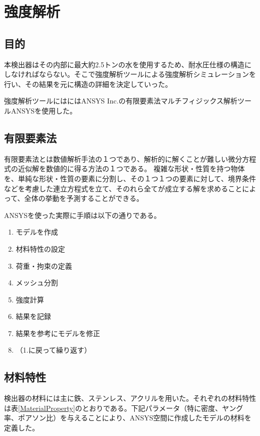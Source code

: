 \documentclass[11pt]{jreport}
\newcommand{\tabref}[1]{表\ref{#1}}
\begin{document}
\newpage
\section{強度解析}
\subsection{目的}
本検出器はその内部に最大約2.5トンの水を使用するため、耐水圧仕様の構造にしなければならない。そこで強度解析ツールによる強度解析シミュレーションを行い、その結果を元に構造の詳細を決定していった。

強度解析ツールにはにはANSYS Inc.の有限要素法マルチフィジックス解析ツールANSYSを使用した。

\subsection{有限要素法}
有限要素法とは数値解析手法の１つであり、解析的に解くことが難しい微分方程式の近似解を数値的に得る方法の１つである。
複雑な形状・性質を持つ物体を、単純な形状・性質の要素に分割し、その１つ１つの要素に対して、境界条件などを考慮した連立方程式を立て、そのれら全てが成立する解を求めることによって、全体の挙動を予測することができる。


ANSYSを使った実際に手順は以下の通りである。

\begin{enumerate}
\item モデルを作成
\item 材料特性の設定
\item 荷重・拘束の定義
\item メッシュ分割
\item 強度計算
\item 結果を記録
\item 結果を参考にモデルを修正
\item （1.に戻って繰り返す）
\end{enumerate}

\subsection{材料特性}
検出器の材料には主に鉄、ステンレス、アクリルを用いた。それぞれの材料特性は\tabref{MaterialProperty}のとおりである。下記パラメータ（特に密度、ヤング率、ポアソン比）を与えることにより、ANSYS空間に作成したモデルの材料を定義した。
\end{document}
